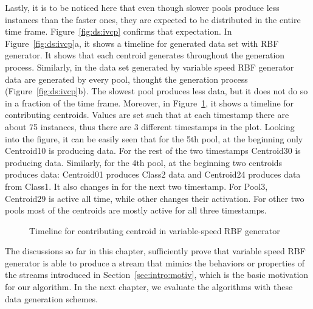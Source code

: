 Lastly, it is to be noticed here that even though slower pools produce less instances than the faster ones, they are expected to be distributed in the entire time frame. Figure~\ref{fig:ds:ivcp} confirms that expectation. In Figure~\ref{fig:ds:ivcp}a, it shows a timeline for generated data set with RBF generator. It shows that each centroid generates throughout the generation process. Similarly, in the data set generated by variable speed RBF generator data are generated by every pool, thought the generation process (Figure~\ref{fig:ds:ivcp}b). The slowest pool produces less data, but it does not do so in a fraction of the time frame. Moreover, in Figure~\ref{fig:ds:ivsc}, it shows a timeline for contributing centroids. Values are set such that at each timestamp there are about 75 instances, thus there are 3 different timestamps in the plot. Looking into the figure, it can be easily seen that for the 5th pool, at the beginning only Centroid10 is producing data. For the rest of the two timestamps Centroid30 is producing data. Similarly, for the 4th pool, at the beginning two centroids produces data: Centroid01 produces Class2 data and Centroid24 produces data from Class1. It also changes in for the next two timestamp. For Pool3, Centroid29 is active all time, while other changes their activation. For other two pools most of the centroids are mostly active for all three timestamps.


\begin{figure}[htbp] 
    \begin{center}
        \caption{Timeline for contributing centroid in variable-speed RBF generator}
        \label{fig:ds:ivsc}
    \end{center}
\end{figure}



The discussions so far in this chapter, sufficiently prove that variable speed RBF generator is able to produce a stream that mimics the behaviors or properties of the streams introduced in Section~\ref{sec:intro:motiv}, which is the basic motivation for our algorithm. In the next chapter, we evaluate the algorithms with these data generation schemes.

